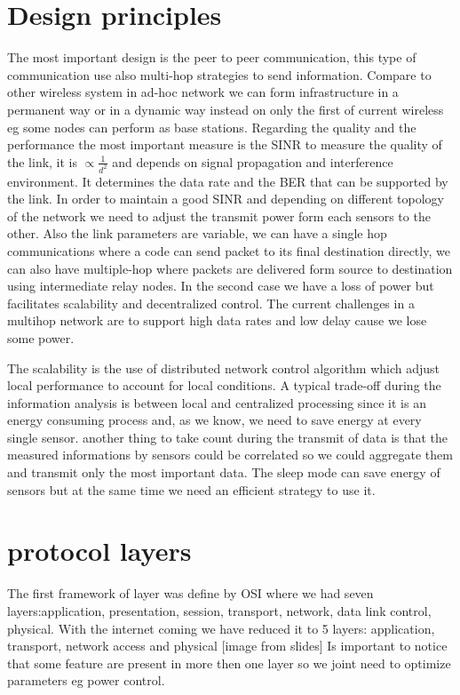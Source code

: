 \section{Design principles}
The most important design is the peer to peer communication, this type of communication use also multi-hop strategies to send information. Compare to other wireless system in ad-hoc network we can form infrastructure in a permanent way or in a dynamic way instead on only the first of current wireless eg some nodes can perform as base stations.
Regarding the quality and the performance the most important measure is the SINR to measure the quality of the link, it is $ \propto\frac{1}{d^2} $ and depends on signal propagation and interference environment. It determines the data rate and the BER that can be supported by the link. In order to maintain a good SINR and depending on different topology of the network we need to adjust the transmit power form each sensors to the other.
Also the link parameters are variable, we can have a single hop communications where a code can send packet to its final destination directly, we can also have multiple-hop where packets are delivered form source to destination using intermediate relay nodes. In the second case we have a loss of power but facilitates scalability and decentralized control. The current challenges in a multihop network are to support high data rates and low delay cause we lose some power.

The scalability is the use of distributed network control algorithm which adjust local performance to account for local conditions. A typical trade-off during the information analysis is between local and centralized processing since it is an energy consuming process and, as we know, we need to save energy at every single sensor. another thing to take count during the transmit of data is that the  measured informations by sensors could be correlated so we could aggregate them and transmit only the most important data. The sleep mode can save energy of sensors but at the same time we need an efficient strategy to use it.

\section{protocol layers}
The first framework of layer was define by OSI where we had seven layers:application, presentation, session, transport, network, data link control, physical. With the internet coming we have reduced it to 5 layers: application, transport, network access and physical [image from slides] 
Is important to notice that some feature are present in more then one layer so we joint need to optimize parameters eg power control. 

